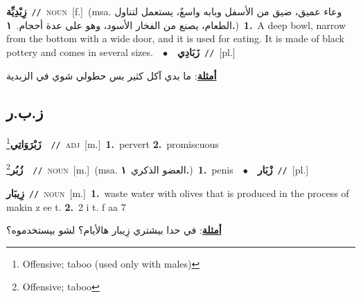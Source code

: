 \documentclass[10pt,a4paper,twoside]{article} %
\begin{document}
\begin{multicols}{2}
{\setlength\topsep{0pt}\textbf{\foreignlanguage{arabic}{زِبْدِيِّة}}\ {\color{gray}\texttt{//}\color{black}}\ \textsc{noun}\ [f.]\ \color{gray}(msa. \foreignlanguage{arabic}{وعاء عميق، ضيق من الأسفل وبابه واسعٌ، يستعمل لتناول الطعام، يصنع من الفخار الأسود، وهو على عدة أحجام.}~\foreignlanguage{arabic}{\textbf{١.}})\color{black}\ \textbf{1.}~A deep bowl, narrow from the bottom with a wide door, and it is used for eating. It is made of black pottery and comes in several sizes.\ \ $\bullet$\ \ \setlength\topsep{0pt}\textbf{\foreignlanguage{arabic}{زَبَادِي}}\ {\color{gray}\texttt{//}\color{black}}\ [pl.]\  \begin{flushright}\color{gray}\foreignlanguage{arabic}{\textbf{\underline{\foreignlanguage{arabic}{أمثلة}}}: ما بدي آكل كثير بس حطولي شوي في الزبدية}\end{flushright}\color{black}} \vspace{2mm}

\vspace{-3mm}
\subsection*{\color{blue}\foreignlanguage{arabic}{ز.ب.ر}\color{blue}{}} 

{\setlength\topsep{0pt}\textbf{\foreignlanguage{arabic}{زَبْرَوَاتِي}}\footnote{Offensive; taboo (used only with males)}\ \ {\color{gray}\texttt{//}\color{black}}\ \textsc{adj}\ [m.]\ \textbf{1.}~pervert  \textbf{2.}~promiscuous\ } \vspace{2mm}

{\setlength\topsep{0pt}\textbf{\foreignlanguage{arabic}{زُبُر}}\footnote{Offensive; taboo}\ \ {\color{gray}\texttt{//}\color{black}}\ \textsc{noun}\ [m.]\ \color{gray}(msa. \foreignlanguage{arabic}{العضو الذكري}~\foreignlanguage{arabic}{\textbf{١.}})\color{black}\ \textbf{1.}~penis\ \ $\bullet$\ \ \setlength\topsep{0pt}\textbf{\foreignlanguage{arabic}{زْبَار}}\ {\color{gray}\texttt{//}\color{black}}\ [pl.]\ } \vspace{2mm}

{\setlength\topsep{0pt}\textbf{\foreignlanguage{arabic}{زِيبَار}}\ {\color{gray}\texttt{//}\color{black}}\ \textsc{noun}\ [m.]\ \textbf{1.}~waste water with olives that is produced in the process of makin z ee t.  \textbf{2.}~2 i t. f aa 7\  \begin{flushright}\color{gray}\foreignlanguage{arabic}{\textbf{\underline{\foreignlanguage{arabic}{أمثلة}}}: في حدا بيشتري زِيبار هالأيام؟ لشو بيستخدموه؟}\end{flushright}\color{black}} \vspace{2mm}


\end{multicols}
\end{document}
